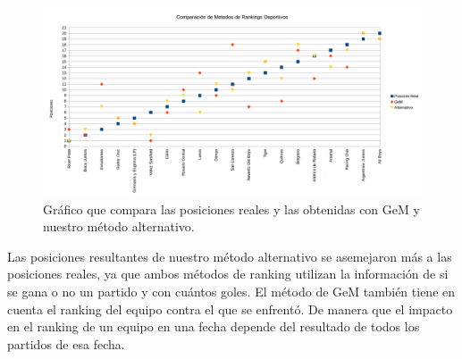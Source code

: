 \begin{figure}[H]
  \includegraphics[scale=0.5]{imagenes/posicionesgem.png}
   \caption{Gráfico que compara las posiciones reales y las obtenidas con GeM y nuestro método alternativo.}
  \label{fig:img1}
\end{figure}

Las posiciones resultantes de nuestro método alternativo se asemejaron más a las posiciones reales, ya que ambos métodos de ranking utilizan la información de si se gana o no un partido y con cuántos goles. El método de GeM también tiene en cuenta el ranking del equipo contra el que se enfrentó. De manera que el impacto en el ranking de un equipo en una fecha depende del resultado de todos los partidos de esa fecha.

